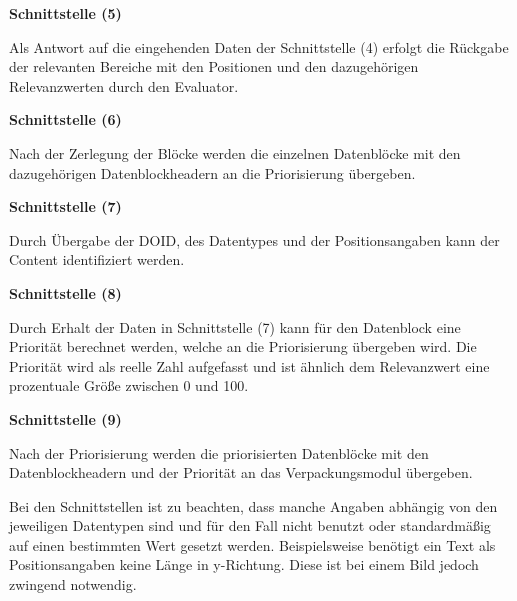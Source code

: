 \textbf{Schnittstelle (5)}

Als Antwort auf die eingehenden Daten der Schnittstelle (4)
erfolgt die Rückgabe der relevanten Bereiche mit den Positionen und den
dazugehörigen Relevanzwerten durch den Evaluator.

\textbf{Schnittstelle (6)} 

Nach der Zerlegung der Blöcke werden die einzelnen
Datenblöcke mit den dazugehörigen Datenblockheadern an die
Priorisierung übergeben.

\textbf{Schnittstelle (7)} 

Durch Übergabe der \gls{DOID}, des Datentypes und der Positionsangaben kann der
Content identifiziert werden.

\textbf{Schnittstelle (8)}

Durch Erhalt der Daten in Schnittstelle (7) kann für
den Datenblock eine Priorität berechnet werden, welche an die Priorisierung übergeben
wird. Die Priorität wird als reelle Zahl aufgefasst und ist ähnlich dem
Relevanzwert eine prozentuale Größe zwischen 0 und 100.

\textbf{Schnittstelle (9)} 

Nach der Priorisierung werden die priorisierten Datenblöcke mit den
Datenblockheadern und der Priorität an das Verpackungsmodul übergeben.

Bei den Schnittstellen ist zu beachten, dass manche Angaben abhängig von den
jeweiligen Datentypen sind und für den Fall nicht benutzt oder
standardmäßig auf einen bestimmten Wert gesetzt werden. Beispielsweise benötigt
ein Text als Positionsangaben keine Länge in y-Richtung. Diese ist bei einem
Bild jedoch zwingend notwendig.
